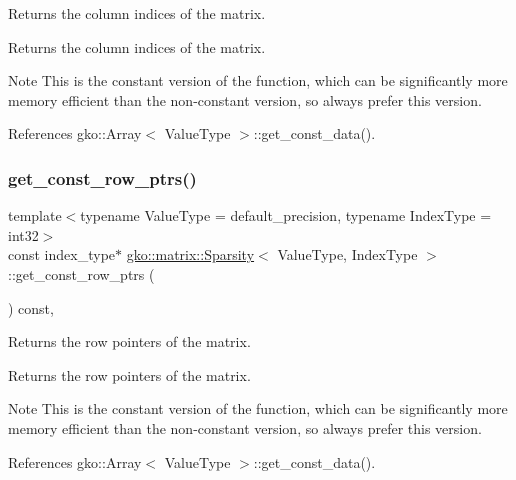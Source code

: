 Returns the column indices of the matrix. 

\begin{DoxyReturn}{Returns}
the column indices of the matrix.
\end{DoxyReturn}
\begin{DoxyNote}{Note}
This is the constant version of the function, which can be significantly more memory efficient than the non-\/constant version, so always prefer this version. 
\end{DoxyNote}


References gko\+::\+Array$<$ Value\+Type $>$\+::get\+\_\+const\+\_\+data().

\mbox{\label{classgko_1_1matrix_1_1Sparsity_a930ba2c53f2c7e667265e836240b997a}} 
\subsubsection{\texorpdfstring{get\+\_\+const\+\_\+row\+\_\+ptrs()}{get\_const\_row\_ptrs()}}
{\footnotesize\ttfamily template$<$typename Value\+Type  = default\+\_\+precision, typename Index\+Type  = int32$>$ \\
const index\+\_\+type$\ast$ \hyperlink{classgko_1_1matrix_1_1Sparsity}{gko\+::matrix\+::\+Sparsity}$<$ Value\+Type, Index\+Type $>$\+::get\+\_\+const\+\_\+row\+\_\+ptrs (\begin{DoxyParamCaption}{ }\end{DoxyParamCaption}) const\hspace{0.3cm}{\ttfamily [inline]}, {\ttfamily [noexcept]}}



Returns the row pointers of the matrix. 

\begin{DoxyReturn}{Returns}
the row pointers of the matrix.
\end{DoxyReturn}
\begin{DoxyNote}{Note}
This is the constant version of the function, which can be significantly more memory efficient than the non-\/constant version, so always prefer this version. 
\end{DoxyNote}


References gko\+::\+Array$<$ Value\+Type $>$\+::get\+\_\+const\+\_\+data().

